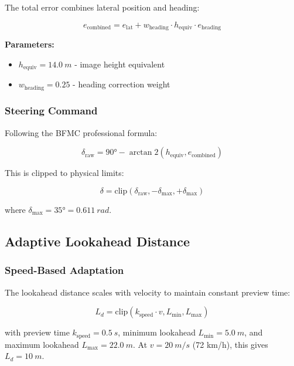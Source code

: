 \documentclass[11pt,a4paper]{article}
\begin{document}
The total error combines lateral position and heading:

\begin{equation}
e_{\text{combined}} = e_{\text{lat}} + w_{\text{heading}} \cdot h_{\text{equiv}} \cdot e_{\text{heading}}
\end{equation}

\textbf{Parameters:}
\begin{itemize}
    \item $h_{\text{equiv}} = \SI{14.0}{m}$ - image height equivalent
    \item $w_{\text{heading}} = 0.25$ - heading correction weight
\end{itemize}

\subsubsection{Steering Command}

Following the BFMC professional formula:

\begin{equation}
\delta_{\text{raw}} = 90° - \arctan2(h_{\text{equiv}}, e_{\text{combined}})
\end{equation}

This is clipped to physical limits:

\begin{equation}
\delta = \text{clip}(\delta_{\text{raw}}, -\delta_{\text{max}}, +\delta_{\text{max}})
\end{equation}

where $\delta_{\text{max}} = 35° = \SI{0.611}{rad}$.

\subsection{Adaptive Lookahead Distance}

\subsubsection{Speed-Based Adaptation}

The lookahead distance scales with velocity to maintain constant preview time:

\begin{equation}
L_d = \text{clip}(k_{\text{speed}} \cdot v, L_{\text{min}}, L_{\text{max}})
\end{equation}

with preview time $k_{\text{speed}} = \SI{0.5}{s}$, minimum lookahead $L_{\text{min}} = \SI{5.0}{m}$, and maximum lookahead $L_{\text{max}} = \SI{22.0}{m}$. At $v = \SI{20}{m/s}$ (72 km/h), this gives $L_d = \SI{10}{m}$.
\end{document}
